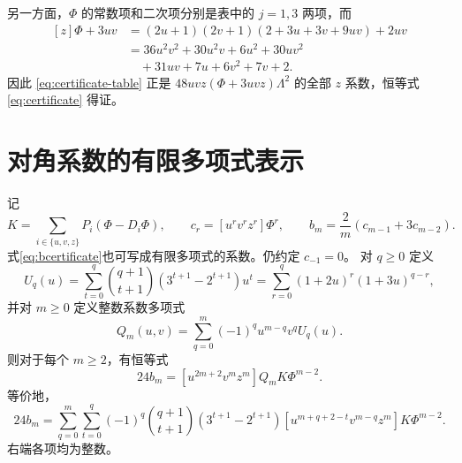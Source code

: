 \documentclass[a4paper,11pt]{article}
\numberwithin{equation}{section}
\theoremstyle{chinese}
\begin{document}
另一方面，$\Phi$ 的常数项和二次项分别是表中的 $j=1,3$ 两项，而
\begin{equation}
\begin{split}
[z]\Phi+3uv
&=(2u+1)(2v+1)(2+3u+3v+9uv)+2uv\\
&=36u^2v^2+30u^2v+6u^2+30uv^2\\
&\quad+31uv+7u+6v^2+7v+2.
\end{split}
\end{equation}
因此 \eqref{eq:certificate-table} 正是
$48uvz(\Phi+3uvz)\Lambda^2$ 的全部 $z$ 系数，恒等式 \eqref{eq:certificate} 得证。

\section{对角系数的有限多项式表示}\label{app:finite-diagonal}
记
\[
 K=\sum_{i\in\{u,v,z\}}P_i(\Phi-D_i\Phi),\qquad
 c_r=[u^rv^rz^r]\Phi^r,\qquad
 b_m=\frac2m(c_{m-1}+3c_{m-2}).
\]
式\eqref{eq:bcertificate}也可写成有限多项式的系数。仍约定 $c_{-1}=0$。
对 $q\ge0$ 定义
\[
 U_q(u)=\sum_{t=0}^q\binom{q+1}{t+1}
        (3^{t+1}-2^{t+1})u^t
       =\sum_{r=0}^q(1+2u)^r(1+3u)^{q-r},
\]
并对 $m\ge0$ 定义整数系数多项式
\[
 Q_m(u,v)=\sum_{q=0}^m(-1)^q u^{m-q}v^qU_q(u).
\]
则对于每个 $m\ge2$，有恒等式
\[
 \boxed{24b_m=[u^{2m+2}v^mz^m]Q_mK\Phi^{m-2}.}
\]
等价地，
\[
\boxed{
24b_m=\sum_{q=0}^m\sum_{t=0}^q(-1)^q\binom{q+1}{t+1}
 (3^{t+1}-2^{t+1})
 [u^{m+q+2-t}v^{m-q}z^m]K\Phi^{m-2}.
}
\]
右端各项均为整数。
\end{document}
